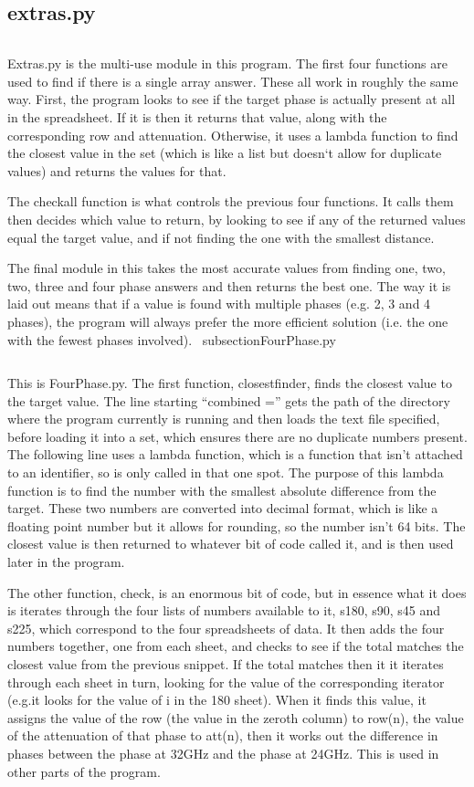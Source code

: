 \documentclass{article}
\newcommand{\q}[1]{``#1''}
\begin{document}
\subsection{extras.py}
\inputminted[linenos, breaklines]{python}{../src/extras.py}
Extras.py is the multi-use module in
this program. The first four functions are used to find if there is a single array answer. These all
work in roughly the same way. First, the program looks to see if the target phase is actually
present at all in the spreadsheet. If it is then it returns that value, along with the corresponding
row and attenuation. Otherwise, it uses a lambda function to find the closest value in the set
(which is like a list but doesn`t allow for duplicate values) and returns the values for that. \par
The checkall function is what controls the previous four functions. It calls them then decides which
value to return, by looking to see if any of the returned values equal the target value, and if not
finding the one with the smallest distance. \par The final module in this takes the most accurate
values from finding one, two, two, three and four phase answers and then returns the best one. The
way it is laid out means that if a value is found with multiple phases (e.g. 2, 3 and 4 phases), the
program will always prefer the more efficient solution (i.e. the one with the fewest phases
involved). \
subsection{FourPhase.py}
\inputminted[linenos, breaklines]{python}{../src/FourPhase.py}
This is FourPhase.py. The first function, closestfinder, finds the closest value to the target
value. The line starting \q{combined =} gets the path of the directory where the program currently
is running and then loads the text file specified, before loading it into a set, which ensures there
are no duplicate numbers present. The following line uses a lambda function, which is a function
that isn't attached to an identifier, so is only called in that one spot. The purpose of this lambda
function is to find the number with the smallest absolute difference from the target. These two
numbers are converted into decimal format, which is like a floating point number but it allows for
rounding, so the number isn't 64 bits. The closest value is then returned to whatever bit of code
called it, and is then used later in the program.\par The other function, check, is an enormous bit
of code, but in essence what it does is iterates through the four lists of numbers available to it,
s180, s90, s45 and s225, which correspond to the four spreadsheets of data. It then adds the four
numbers together, one from each sheet, and checks to see if the total matches the closest value from
the previous snippet. If the total matches then it it iterates through each sheet in turn, looking
for the value of the corresponding iterator (e.g.it looks for the value of i in the 180 sheet). When
it finds this value, it assigns the value of the row (the value in the zeroth column) to row(n), the
value of the attenuation of that phase to att(n), then it works out the difference in phases between
the phase at 32GHz and the phase at 24GHz. This is used in other parts of the program.
\end{document}
